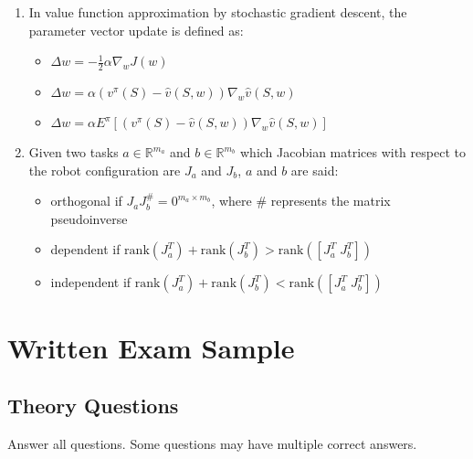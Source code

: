 \documentclass[openany]{book}
\theoremstyle{definition}
\theoremstyle{remark}
\begin{document}
\begin{enumerate}
    \item In value function approximation by stochastic gradient descent, the parameter vector update is defined as:
    \begin{itemize}
        \item[] $\Delta w = -\frac{1}{2}\alpha\nabla_w J(w)$
        \item[\checkmark] $\Delta w = \alpha(v^\pi(S) - \hat{v}(S,w))\nabla_w \hat{v}(S,w)$
        \item[] $\Delta w = \alpha E^\pi[(v^\pi(S) - \hat{v}(S,w))\nabla_w \hat{v}(S,w)]$
    \end{itemize}

    \item Given two tasks $a \in \mathbb{R}^{m_a}$ and $b \in \mathbb{R}^{m_b}$ which Jacobian matrices with respect to the robot configuration are $J_a$ and $J_b$, $a$ and $b$ are said:
    \begin{itemize}
        \item[\checkmark] orthogonal if $J_aJ_b^\# = 0^{m_a\times m_b}$, where $\#$ represents the matrix pseudoinverse
        \item[\checkmark] dependent if $\text{rank}(J_a^T) + \text{rank}(J_b^T) > \text{rank}([J_a^T\; J_b^T])$
        \item[] independent if $\text{rank}(J_a^T) + \text{rank}(J_b^T) < \text{rank}([J_a^T\; J_b^T])$
    \end{itemize}
\end{enumerate}

\chapter{Written Exam Sample}

\section*{Theory Questions}
Answer all questions. Some questions may have multiple correct answers.
\end{document}
